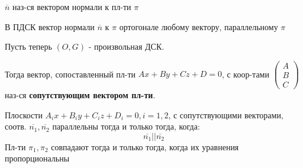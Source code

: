 \begin{definition}
  $\overline{n}$ наз-ся вектором нормали к пл-ти $\pi$
\end{definition}
\begin{statement}
В ПДСК вектор нормали $\overline{n}$ к $\pi$ ортогонале любому вектору, параллельному $\pi$
\end{statement}

Пусть теперь $(O, G)$ - произвольная ДСК. \\
\begin{definition}
Тогда вектор, сопоставленный пл-ти $Ax + By + Cz + D = 0$, с коор-тами $\begin{pmatrix} A \\ B \\ C \end{pmatrix}$ наз-ся \textbf{сопутствующим вектором пл-ти}.
\end{definition}
\begin{statement}
  Плоскости $A_ix + B_iy + C_iz + D_i = 0, i = 1,2$, с сопутствующими векторами, соотв. $\overline{n_1}, \overline{n_2}$ параллельны тогда и только тогда, когда:
  \[
  \overline{n_1} || \overline{n_2}
  \]
 Пл-ти $\pi_1, \pi_2$ совпадают тогда и только тогда, когда их уравнения пропорциональны
\end{statement}
